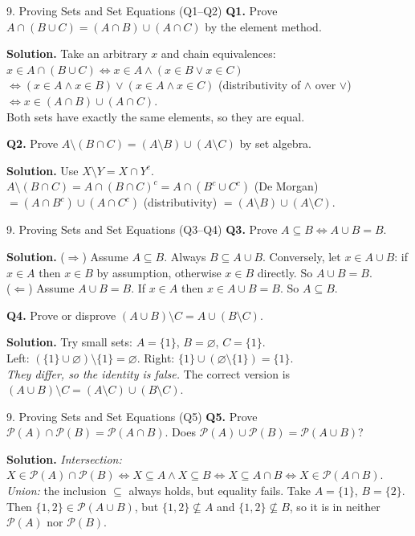 \documentclass[aspectratio=169,10pt]{beamer}
\newcommand{\qa}[3]{%
  \textbf{Q#1.} #2\par\smallskip
  {\color{ans}\textbf{Solution.} #3}\par\vspace{6pt}}
\begin{document}
\begin{frame}{9. Proving Sets and Set Equations (Q1--Q2)}
\footnotesize
\qa{1}{Prove $A\cap(B\cup C)=(A\cap B)\cup(A\cap C)$ by the element method.}
{Take an arbitrary $x$ and chain equivalences:\\
$x\in A\cap(B\cup C)\iff x\in A\land(x\in B\lor x\in C)$\\
$\iff(x\in A\land x\in B)\lor(x\in A\land x\in C)$ (distributivity of $\land$ over $\lor$)\\
$\iff x\in(A\cap B)\cup(A\cap C)$.\\
Both sets have exactly the same elements, so they are equal.}
\qa{2}{Prove $A\setminus(B\cap C)=(A\setminus B)\cup(A\setminus C)$ by set algebra.}
{Use $X\setminus Y=X\cap Y^c$.\\
$A\setminus(B\cap C)=A\cap(B\cap C)^c=A\cap(B^c\cup C^c)$ (De Morgan)\\
$=(A\cap B^c)\cup(A\cap C^c)$ (distributivity) $=(A\setminus B)\cup(A\setminus C)$.}
\end{frame}

\begin{frame}{9. Proving Sets and Set Equations (Q3--Q4)}
\footnotesize
\qa{3}{Prove $A\subseteq B\iff A\cup B=B$.}
{($\Rightarrow$) Assume $A\subseteq B$. Always $B\subseteq A\cup B$. Conversely, let $x\in A\cup B$: if $x\in A$ then $x\in B$ by assumption, otherwise $x\in B$ directly. So $A\cup B=B$.\\
($\Leftarrow$) Assume $A\cup B=B$. If $x\in A$ then $x\in A\cup B=B$. So $A\subseteq B$.}
\qa{4}{Prove or disprove $(A\cup B)\setminus C=A\cup(B\setminus C)$.}
{Try small sets: $A=\{1\}$, $B=\varnothing$, $C=\{1\}$.\\
Left: $(\{1\}\cup\varnothing)\setminus\{1\}=\varnothing$. Right: $\{1\}\cup(\varnothing\setminus\{1\})=\{1\}$.\\
\emph{They differ, so the identity is false.} The correct version is $(A\cup B)\setminus C=(A\setminus C)\cup(B\setminus C)$.}
\end{frame}

\begin{frame}{9. Proving Sets and Set Equations (Q5)}
\footnotesize
\qa{5}{Prove $\mathcal{P}(A)\cap\mathcal{P}(B)=\mathcal{P}(A\cap B)$. Does $\mathcal{P}(A)\cup\mathcal{P}(B)=\mathcal{P}(A\cup B)$?}
{\emph{Intersection:} $X\in\mathcal P(A)\cap\mathcal P(B)\iff X\subseteq A\land X\subseteq B\iff X\subseteq A\cap B\iff X\in\mathcal P(A\cap B)$.\\
\emph{Union:} the inclusion $\subseteq$ always holds, but equality fails. Take $A=\{1\}$, $B=\{2\}$. Then $\{1,2\}\in\mathcal P(A\cup B)$, but $\{1,2\}\not\subseteq A$ and $\{1,2\}\not\subseteq B$, so it is in neither $\mathcal P(A)$ nor $\mathcal P(B)$.}
\end{frame}
\end{document}
